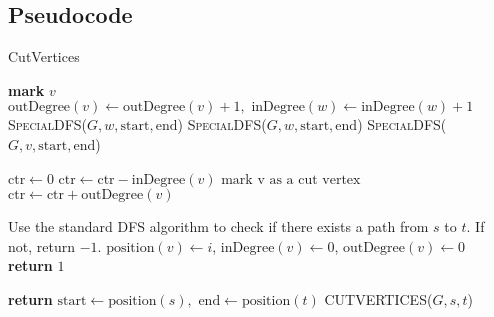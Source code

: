 \documentclass{article}
\begin{document}
\subsection{Pseudocode}
\begin{algorithm}
\caption{CutVertices}
\begin{algorithmic}[1]
    \State \textbf{mark} $v$
                    \State $\text{outDegree}(v) \gets \text{outDegree}(v) + 1, \text{ inDegree}(w) \gets \text{inDegree}(w) + 1$
                \EndIf
                \State \textsc{SpecialDFS}($G, w, \text{start}, \text{end}$)
            \EndIf
        \EndFor
    \Else
                \State \textsc{SpecialDFS}($G, w, \text{start}, \text{end}$)
            \EndIf
        \EndFor
    \EndIf
\EndProcedure
\Statex
{}
            \State \textsc{SpecialDFS}($G, v, \text{start}, \text{end}$)
        \EndIf
    \EndFor
\EndProcedure
\Statex

    \State $\text{ctr} \gets 0$
        \State $\text{ctr} \gets \text{ctr} - \text{inDegree}(v)$
            \State $\text{mark v as a cut vertex}$
        \EndIf
        \State $\text{ctr} \gets \text{ctr} + \text{outDegree}(v)$
    \EndFor
\EndProcedure
\Statex

    \State Use the standard DFS algorithm to check if there exists a path from $s$ to $t$. If not, return $-1$.
        \State $\text{position}(v) \gets i$, $\text{inDegree}(v) \gets 0$, $\text{outDegree}(v) \gets 0$
    \EndFor
    \State \textbf{return} $1$
\EndProcedure
\Statex

        \State \textbf{return}
    \EndIf
    \State $\text{start} \gets \text{position}(s), \text{ end} \gets \text{position}(t)$
    \State \textsc{CUTVERTICES}($G, s, t$)
\EndProcedure

\end{algorithmic}
\end{algorithm}
\end{document}
